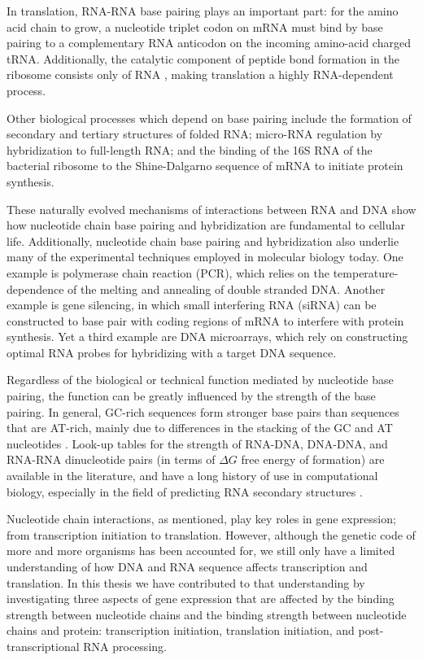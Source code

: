 In translation, RNA-RNA base pairing plays an important part: for the amino
acid chain to grow, a nucleotide triplet codon on mRNA must bind by base
pairing to a complementary RNA anticodon on the incoming amino-acid charged
tRNA. Additionally, the catalytic component of peptide bond formation in the
ribosome consists only of RNA \cite{steitz_rna_2003}, making translation a
highly RNA-dependent process.

Other biological processes which depend on base pairing include the formation
of secondary and tertiary structures of folded RNA; micro-RNA regulation by
hybridization to full-length RNA; and the binding of the 16S RNA of the
bacterial ribosome to the Shine-Dalgarno sequence of mRNA to
initiate protein synthesis.

These naturally evolved mechanisms of interactions between RNA and DNA show how
nucleotide chain base pairing and hybridization are fundamental to cellular
life. Additionally, nucleotide chain base pairing and hybridization also
underlie many of the experimental techniques employed in molecular biology
today. One example is polymerase chain reaction (PCR), which relies on the
temperature-dependence of the melting and annealing of double stranded DNA.
Another example is gene silencing, in which small interfering RNA (siRNA) can
be constructed to base pair with coding regions of mRNA to interfere with
protein synthesis. Yet a third example are DNA microarrays, which rely on
constructing optimal RNA probes for hybridizing with a target DNA sequence.

Regardless of the biological or technical function mediated by nucleotide base
pairing, the function can be greatly influenced by the strength of the base
pairing. In general, GC-rich sequences form stronger base pairs than sequences
that are AT-rich, mainly due to differences in the stacking of the GC and AT
nucleotides \cite{yakovchuk_base-stacking_2006}. Look-up tables for the
strength of RNA-DNA, DNA-DNA, and RNA-RNA dinucleotide pairs (in terms of
$\Delta G$ free energy of formation) are available in the literature, and have
a long history of use in computational biology, especially in the field of
predicting RNA secondary structures \cite{mathews_prediction_2006}. 

Nucleotide chain interactions, as mentioned, play key roles in gene expression;
from transcription initiation to translation. However, although the genetic
code of more and more organisms has been accounted for, we still only have a
limited understanding of how DNA and RNA sequence affects transcription and
translation. In this thesis we have contributed to that understanding by
investigating three aspects of gene expression that are affected by the binding
strength between nucleotide chains and the binding strength between nucleotide
chains and protein: transcription initiation, translation initiation, and
post-transcriptional RNA processing.

